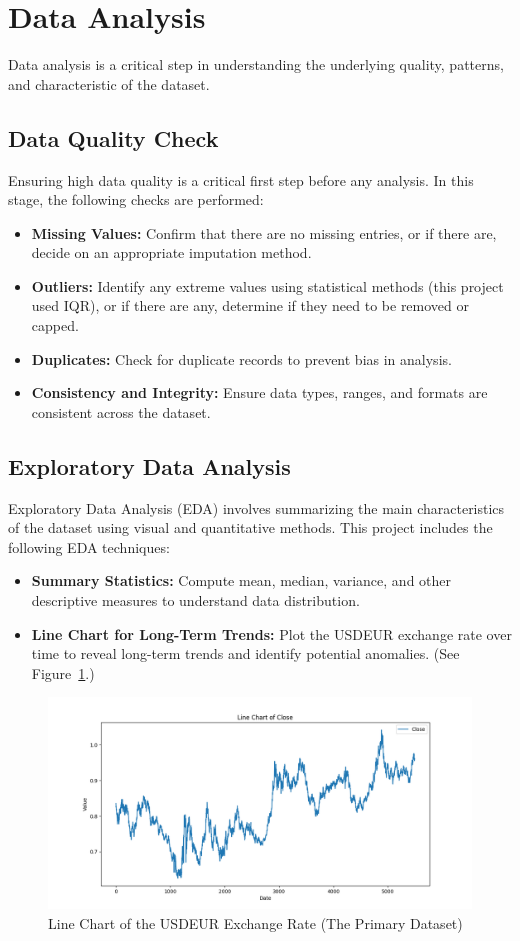 \section{Data Analysis}
Data analysis is a critical step in understanding the underlying quality, patterns, and characteristic of the dataset.

\subsection{Data Quality Check}
Ensuring high data quality is a critical first step before any analysis.
In this stage, the following checks are performed:
\begin{itemize}
    \item \textbf{Missing Values:} Confirm that there are no missing entries, or if there are, decide on an appropriate imputation method.
    \item \textbf{Outliers:} Identify any extreme values using statistical methods (this project used IQR), or if there are any, determine if they need to be removed or capped.
    \item \textbf{Duplicates:} Check for duplicate records to prevent bias in analysis.
    \item \textbf{Consistency and Integrity:} Ensure data types, ranges, and formats are consistent across the dataset.
\end{itemize}

\subsection{Exploratory Data Analysis}
Exploratory Data Analysis (EDA) involves summarizing the main characteristics of the dataset using visual and quantitative methods.
This project includes the following EDA techniques:
\begin{itemize}
    \item \textbf{Summary Statistics:} Compute mean, median, variance, and other descriptive measures to understand data distribution.
    \item \textbf{Line Chart for Long-Term Trends:} Plot the USDEUR exchange rate over time to reveal long-term trends and identify potential anomalies. (See Figure~\ref{fig:line_chart}.)
\end{itemize}

\begin{figure}[H]
\centering
\includegraphics[width=\textwidth]{figures/line_chart}
\caption{Line Chart of the USDEUR Exchange Rate (The Primary Dataset)}
\label{fig:line_chart}
\end{figure}

